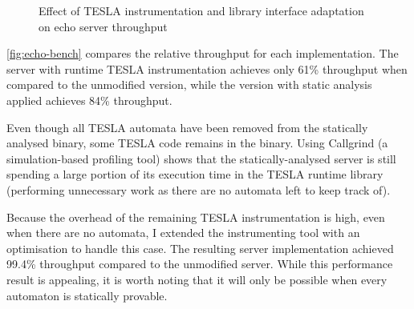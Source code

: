 \begin{figure}[ht]
  \centering
  \caption{Effect of TESLA instrumentation and library interface adaptation on
  echo server throughput}
  \label{fig:echo-bench}
\end{figure}

\autoref{fig:echo-bench} compares the relative throughput for each
implementation. The server with runtime TESLA instrumentation achieves only 61\%
throughput when compared to the unmodified version, while the version with
static analysis applied achieves 84\% throughput.

Even though all TESLA automata have been removed from the statically analysed
binary, some TESLA code remains in the binary. Using Callgrind
\cite{weidendorfer_tool_2004} (a simulation-based profiling tool) shows that the
statically-analysed server is still spending a large portion of its execution
time in the TESLA runtime library (performing unnecessary work as there are no
automata left to keep track of).

Because the overhead of the remaining TESLA instrumentation is high, even when
there are no automata, I extended the instrumenting tool with an optimisation to
handle this case. The resulting server implementation achieved 99.4\% throughput
compared to the unmodified server. While this performance result is appealing,
it is worth noting that it will only be possible when every automaton is
statically provable.


